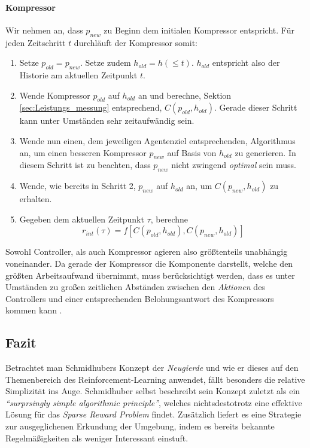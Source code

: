 \paragraph{Kompressor} Wir nehmen an, dass \(p_{new}\) zu Beginn dem initialen Kompressor entspricht. Für jeden Zeitschritt \(t\) durchläuft der Kompressor somit:
\begin{enumerate}
  \item Setze \(p_{old} = p_{new}\). Setze zudem \(h_{old} = h(\leq t)\). \(h_{old}\) entspricht also der Historie am aktuellen Zeitpunkt \(t\).
  \item Wende Kompressor \(p_{old}\) auf \(h_{old}\) an und berechne, Sektion \ref{sec:Leistungs_messung} entsprechend, \(C(p_{old},h_{old})\). Gerade dieser Schritt kann unter Umständen sehr zeitaufwändig sein.
  \item Wende nun einen, dem jeweiligen Agentenziel entsprechenden, Algorithmus an, um einen besseren Kompressor \(p_{new}\) auf Basis von \(h_{old}\) zu generieren. In diesem Schritt ist zu beachten, dass \(p_{new}\) nicht zwingend \emph{optimal} sein muss.
  \item Wende, wie bereits in Schritt 2, \(p_{new}\) auf \(h_{old}\) an, um \(C(p_{new},h_{old})\) zu erhalten.
  \item Gegeben dem aktuellen Zeitpunkt \(\tau\), berechne \begin{equation} r_{int}(\tau) = f \left[C(p_{old},h_{old}),C(p_{new},h_{old})\right] \end{equation}
\end{enumerate} 

Sowohl Controller, als auch Kompressor agieren also größtenteils unabhängig voneinander. Da gerade der Kompressor die Komponente darstellt, welche den größten Arbeitsaufwand übernimmt, muss berücksichtigt werden, dass es unter Umständen zu großen zeitlichen Abständen zwischen den \emph{Aktionen} des Controllers und einer entsprechenden Belohungsantwort des Kompressors kommen kann \cite[p.~20]{curiosity_schmidhuber}.

\subsection{Fazit}
Betrachtet man Schmidhubers Konzept der \emph{Neugierde} und wie er dieses auf den Themenbereich des Reinforcement-Learning anwendet, fällt besonders die relative Simplizität ins Auge. Schmidhuber selbst beschreibt sein Konzept zuletzt als ein \emph{``surprsingly simple algorithmic principle''}\cite[p.~16]{curiosity_schmidhuber}, welches nichtsdestotrotz eine effektive Lösung für das \emph{Sparse Reward Problem} findet. Zusätzlich liefert es eine Strategie zur ausgeglichenen Erkundung der Umgebung, indem es bereits bekannte Regelmäßigkeiten als weniger Interessant einstuft.